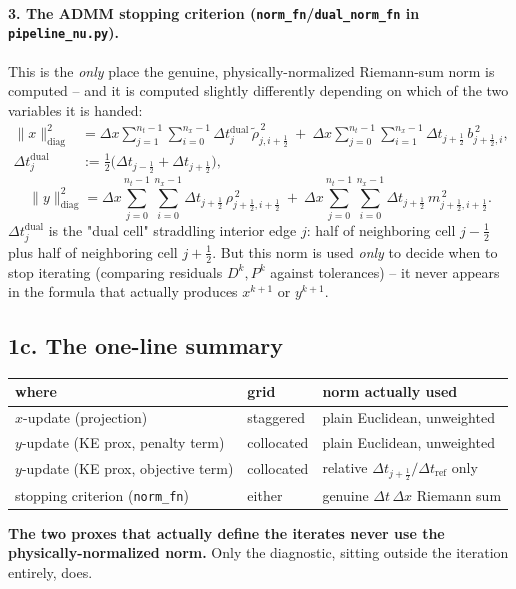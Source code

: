 \documentclass[11pt]{article}
\newcommand{\dt}{\Delta t}
\newcommand{\dx}{\Delta x}
\newcommand{\code}[1]{\texttt{#1}}
\newcommand{\half}{\tfrac12}
\begin{document}
\paragraph{3. The ADMM stopping criterion (\code{norm\_fn}/\code{dual\_norm\_fn} in
\code{pipeline\_nu.py}).} This is the \emph{only} place the genuine, physically-normalized
Riemann-sum norm is computed -- and it is computed slightly differently depending on which of the
two variables it is handed:
\begin{align*}
  \|x\|^2_\mathrm{diag} &= \dx\sum_{j=1}^{n_t-1}\sum_{i=0}^{n_x-1} \dt_j^\mathrm{dual}\,
  \tilde\rho_{j,i+\half}^{\,2}
  \ + \
  \dx\sum_{j=0}^{n_t-1}\sum_{i=1}^{n_x-1} \dt_{j+\half}\,b_{j+\half,i}^{\,2}, \\
  \dt_j^\mathrm{dual} &:= \half\bigl(\dt_{j-\half}+\dt_{j+\half}\bigr),
\end{align*}
\[
  \|y\|^2_\mathrm{diag} = \dx\sum_{j=0}^{n_t-1}\sum_{i=0}^{n_x-1} \dt_{j+\half}\,\rho_{j+\half,i+\half}^{\,2}
  \ + \
  \dx\sum_{j=0}^{n_t-1}\sum_{i=0}^{n_x-1} \dt_{j+\half}\,m_{j+\half,i+\half}^{\,2}.
\]
$\dt_j^\mathrm{dual}$ is the "dual cell" straddling interior edge $j$: half of neighboring cell
$j-\half$ plus half of neighboring cell $j+\half$. But this norm is used \emph{only} to decide when
to stop iterating (comparing residuals $D^k,P^k$ against tolerances) -- it never appears in the
formula that actually produces $x^{k+1}$ or $y^{k+1}$.

\subsection*{1c. The one-line summary}

\begin{center}
\begin{tabular}{@{}lll@{}}
\toprule
where & grid & norm actually used \\
\midrule
$x$-update (projection) & staggered & plain Euclidean, unweighted \\
$y$-update (KE prox, penalty term) & collocated & plain Euclidean, unweighted \\
$y$-update (KE prox, objective term) & collocated & relative $\dt_{j+\half}/\dt_\mathrm{ref}$ only \\
stopping criterion (\code{norm\_fn}) & either & genuine $\dt\,\dx$ Riemann sum \\
\bottomrule
\end{tabular}
\end{center}

\noindent \textbf{The two proxes that actually define the iterates never use the physically-normalized
norm.} Only the diagnostic, sitting outside the iteration entirely, does.
\end{document}
